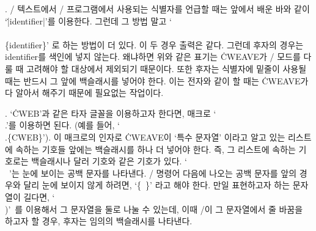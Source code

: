 {%
. \TEX/ 텍스트에서 \CEE/ 프로그램에서 사용되는 식별자를  언급할 때는 앞에서 배운
바와 같이 `\.{|identifier|}'를 이용한다. 그런데 그 방법 말고 `\.{\\\\\{identifier\}}'
로 하는 방법이 더 있다. 이 두 경우 출력은 같다. 그런데 후자의 경우는 \\{identifier}를 
색인에 넣지 않는다. 왜냐하면 위와 같은 표기는 \.{CWEAVE}가 \CEE/ 모드를 다룰 때 고려해야
할 대상에서 제외되기 때문이다. 또한 후자는 식별자에 밑줄이 사용될 때는 반드시
그 앞에 백슬래시를 넣어야 한다. 이는 전자와 같이 할 때는 \.{CWEAVE}가 다 알아서 해주기
때문에 필요없는 작업이다.

. `\.{CWEB}'과 같은 타자 글꼴을 이용하고자 한다면, 매크로 `\.{\\.}'를 이용하면
된다. (예를 들어, `\.{\\.\{CWEB\}}'). 이 매크로의 인자로 \.{CWEAVE}이 `특수 문자열'
이라고 알고 있는 리스트에 속하는 기호들 앞에는 백슬래시를 하나 더 넣어야 한다. 즉, 그 리스트에
속하는 기호로는 백슬래시나 달러 기호와 같은 기호가 있다. `\.{\\\ }'는 눈에 보이는 공백 문자를
나타낸다. \TEX/ 명령어 다음에 나오는 공백 문자를 앞의 경우와 달리 눈에 보이지 않게 하려면,
`\.{\{\ \}}' 라고 해야 한다. 만일 표현하고자 하는 문자열이 길다면, `\.{\\)}'\, 를
이용해서 그 문자열을 둘로 나눌 수 있는데, 이때 \TEX/이 그 문자열에서 줄 바꿈을 하고자 할 경우,
후자는 임의의 백슬래시를 나타낸다.

}
